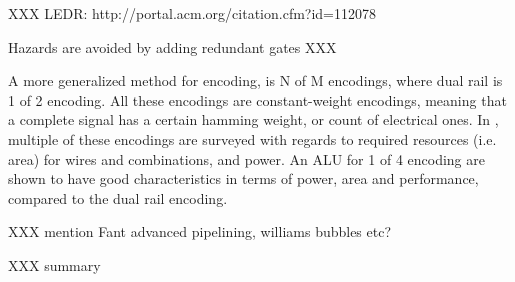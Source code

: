 XXX LEDR: http://portal.acm.org/citation.cfm?id=112078


Hazards are avoided by adding redundant gates XXX

A more generalized method for encoding, is N of M encodings, where
dual rail is 1 of 2 encoding. All these encodings are constant-weight
encodings, meaning that a complete signal has a certain hamming
weight, or count of electrical ones. In \cite[chapter 9]{nullconv},
multiple of these encodings are surveyed with regards to required
resources (i.e. area) for wires and combinations, and power. An ALU
for 1 of 4 encoding are shown to have good characteristics in terms of
power, area and performance, compared to the dual rail encoding.

XXX mention Fant advanced pipelining, williams bubbles etc?

XXX summary
